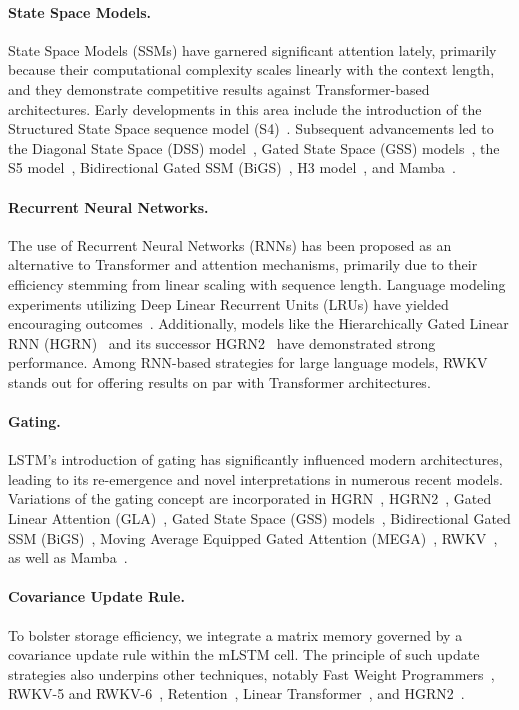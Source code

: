 \paragraph{State Space Models.} State Space Models (SSMs) have garnered significant attention lately, primarily because their computational complexity scales linearly with the context length, and they demonstrate competitive results against Transformer-based architectures. Early developments in this area include the introduction of the Structured State Space sequence model (S4)~\citep{Gu:21}. Subsequent advancements led to the Diagonal State Space (DSS) model~\citep{Gupta:22}, Gated State Space (GSS) models~\citep{Mehta:22}, the S5 model~\citep{Smith:22}, Bidirectional Gated SSM (BiGS)~\citep{Wang:22}, H3 model~\citep{Fu:23}, and Mamba~\citep{Gu:24arxiv}.

\paragraph{Recurrent Neural Networks.} The use of Recurrent Neural Networks (RNNs) has been proposed as an alternative to Transformer and attention mechanisms, primarily due to their efficiency stemming from linear scaling with sequence length. Language modeling experiments utilizing Deep Linear Recurrent Units (LRUs) have yielded encouraging outcomes~\citep{Orvieto:23, De:24arxiv}. Additionally, models like the Hierarchically Gated Linear RNN (HGRN)~\citep{Qin:23} and its successor HGRN2~\citep{Qin:24arxiv} have demonstrated strong performance. Among RNN-based strategies for large language models, RWKV~\citep{Peng:23arxivshort,Peng:24arxivshort} stands out for offering results on par with Transformer architectures.

\paragraph{Gating.}
LSTM's introduction of gating has significantly influenced modern architectures, leading to its re-emergence and novel interpretations in numerous recent models. Variations of the gating concept are incorporated in HGRN~\citep{Qin:23}, HGRN2~\citep{Qin:24arxiv}, Gated Linear Attention (GLA)~\citep{Yang:23arxiv}, Gated State Space (GSS) models~\citep{Mehta:22}, Bidirectional Gated SSM (BiGS)~\citep{Wang:22}, Moving Average Equipped Gated Attention (MEGA)~\citep{Ma:22}, RWKV~\citep{Peng:23arxivshort}, as well as Mamba~\citep{Gu:24arxiv}.

\paragraph{Covariance Update Rule.} 
To bolster storage efficiency, we integrate a matrix memory governed by a covariance update rule within the mLSTM cell. The principle of such update strategies also underpins other techniques, notably Fast Weight Programmers~\citep{Schmidhuber:92ncfastweights,Schlag:21}, RWKV-5 and RWKV-6~\citep{Peng:24arxivshort}, Retention~\citep{Sun:23arxiv}, Linear Transformer~\citep{Katharopoulos:20}, and HGRN2~\citep{Qin:24arxiv}.

